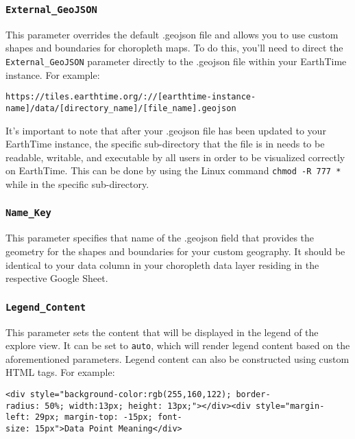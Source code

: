 \documentclass[
  12pt,
]{krantz}
\begin{document}
\hypertarget{external_geojson}{%
\subsubsection*{\texorpdfstring{\texttt{External\_GeoJSON}}{External\_GeoJSON}}\label{external_geojson}}


This parameter overrides the default .geojson file and allows you to use custom shapes and boundaries for choropleth maps. To do this, you'll need to direct the \texttt{External\_GeoJSON} parameter directly to the .geojson file within your EarthTime instance. For example:

\texttt{https://tiles.earthtime.org/://{[}earthtime-instance-name{]}/data/{[}directory\_name{]}/{[}file\_name{]}.geojson}

It's important to note that after your .geojson file has been updated to your EarthTime instance, the specific sub-directory that the file is in needs to be readable, writable, and executable by all users in order to be visualized correctly on EarthTime. This can be done by using the Linux command \texttt{chmod\ -R\ 777\ *} while in the specific sub-directory.

\hypertarget{name_key}{%
\subsubsection*{\texorpdfstring{\texttt{Name\_Key}}{Name\_Key}}\label{name_key}}


This parameter specifies that name of the .geojson field that provides the geometry for the shapes and boundaries for your custom geography. It should be identical to your data column in your choropleth data layer residing in the respective Google Sheet.

\hypertarget{legend_content}{%
\subsubsection*{\texorpdfstring{\texttt{Legend\_Content}}{Legend\_Content}}\label{legend_content}}


This parameter sets the content that will be displayed in the legend of the explore view. It can be set to \texttt{auto}, which will render legend content based on the aforementioned parameters. Legend content can also be constructed using custom HTML tags. For example:

\texttt{\textless{}div\ style="background-color:rgb(255,160,122);\ border-radius:\ 50\%;\ width:13px;\ height:\ 13px;"\textgreater{}\textless{}/div\textgreater{}\textless{}div\ style="margin-left:\ 29px;\ margin-top:\ -15px;\ font-size:\ 15px"\textgreater{}Data\ Point\ Meaning\textless{}/div\textgreater{}}
\end{document}
